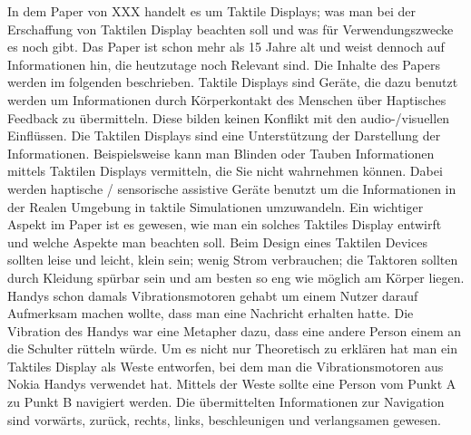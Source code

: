 
In dem Paper von XXX \cite{} handelt es um Taktile Displays; was man bei der Erschaffung von Taktilen Display beachten soll und was f{\"u}r Verwendungszwecke es noch gibt. Das Paper ist schon mehr als 15 Jahre alt und weist dennoch auf Informationen hin, die heutzutage noch Relevant sind. Die Inhalte des Papers werden im folgenden beschrieben.
Taktile Displays sind Ger{\"a}te, die dazu benutzt werden um Informationen durch K{\"o}rperkontakt des Menschen {\"u}ber Haptisches Feedback zu {\"u}bermitteln. Diese bilden keinen Konflikt mit den audio-/visuellen Einfl{\"u}ssen. Die Taktilen Displays sind eine Unterst{\"u}tzung der Darstellung der Informationen. 
Beispielsweise kann man Blinden oder Tauben Informationen mittels Taktilen Displays vermitteln, die Sie nicht wahrnehmen k{\"o}nnen.
Dabei werden haptische / sensorische assistive Ger{\"a}te benutzt um die Informationen in der Realen Umgebung in taktile Simulationen umzuwandeln.
Ein wichtiger Aspekt im Paper ist es gewesen, wie man ein solches Taktiles Display entwirft und welche Aspekte man beachten soll. 
Beim Design eines Taktilen Devices sollten leise und leicht, klein sein; wenig Strom verbrauchen; die Taktoren sollten durch Kleidung sp{\"u}rbar sein und am besten so eng wie m{\"o}glich am K{\"o}rper liegen.  
Handys schon damals Vibrationsmotoren gehabt um einem Nutzer darauf Aufmerksam machen wollte, dass man eine Nachricht erhalten hatte.
Die Vibration des Handys war eine Metapher dazu, dass eine andere Person einem an die Schulter r{\"u}tteln w{\"u}rde. \cite{} 
Um es nicht nur Theoretisch zu erkl{\"a}ren hat man ein Taktiles Display als Weste entworfen, bei dem man die Vibrationsmotoren aus Nokia Handys verwendet hat. Mittels der Weste sollte eine Person vom Punkt A zu Punkt B navigiert werden. 
Die {\"u}bermittelten Informationen zur Navigation sind vorw{\"a}rts, zur{\"u}ck, rechts, links, beschleunigen und verlangsamen gewesen. 